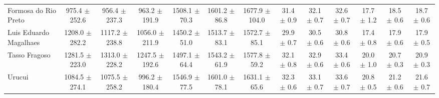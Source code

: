 \begin{table}[H]
\begin{tabular}{lcccccccccccc}
Formosa do Rio Preto & 975.4 $\pm$ 252.6 & 956.4 $\pm$ 237.3 & 963.2 $\pm$ 191.9 & 1508.1 $\pm$ 70.3 & 1601.2 $\pm$ 86.8 & 1677.9 $\pm$ 104.0 & 31.4 $\pm$ 0.9 & 32.1 $\pm$ 0.7 & 32.6 $\pm$ 0.7 & 17.7 $\pm$ 1.2 & 18.5 $\pm$ 0.6 & 18.7 $\pm$ 0.6 \\
Luis Eduardo Magalhaes & 1208.0 $\pm$ 282.2 & 1117.2 $\pm$ 238.8 & 1056.0 $\pm$ 211.9 & 1450.2 $\pm$ 51.0 & 1513.7 $\pm$ 83.1 & 1572.7 $\pm$ 85.1 & 29.9 $\pm$ 0.7 & 30.5 $\pm$ 0.6 & 30.8 $\pm$ 0.6 & 17.4 $\pm$ 0.8 & 17.9 $\pm$ 0.6 & 17.9 $\pm$ 0.5 \\
Tasso Fragoso & 1281.5 $\pm$ 223.0 & 1313.0 $\pm$ 228.2 & 1247.5 $\pm$ 192.6 & 1497.1 $\pm$ 64.4 & 1543.2 $\pm$ 61.9 & 1577.8 $\pm$ 59.2 & 32.1 $\pm$ 0.8 & 32.9 $\pm$ 0.6 & 33.4 $\pm$ 0.6 & 20.0 $\pm$ 1.0 & 20.7 $\pm$ 0.3 & 20.9 $\pm$ 0.3 \\
Urucui & 1084.5 $\pm$ 274.1 & 1075.5 $\pm$ 258.2 & 996.2 $\pm$ 180.4 & 1546.9 $\pm$ 77.5 & 1601.0 $\pm$ 78.1 & 1631.1 $\pm$ 65.6 & 32.3 $\pm$ 0.6 & 33.1 $\pm$ 0.7 & 33.6 $\pm$ 0.7 & 20.8 $\pm$ 0.5 & 21.2 $\pm$ 0.6 & 21.6 $\pm$ 0.7 \\
\bottomrule
\end{tabular}
\end{table}